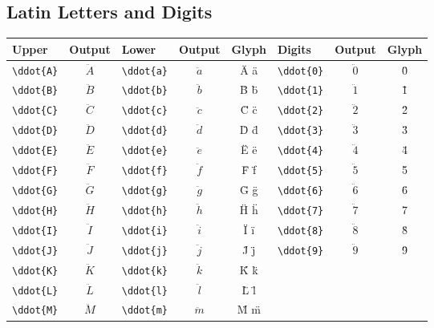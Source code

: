 \documentclass[12pt,a4paper]{article}
\begin{document}
\subsection*{Latin Letters and Digits}
\begin{longtable}{|l|c|l|c|c|l|c|c|}
\hline
\textbf{Upper}  & \textbf{Output} & \textbf{Lower}  & \textbf{Output} & \textbf{Glyph} & \textbf{Digits} & \textbf{Output} & \textbf{Glyph} \\
\hline
\verb|\ddot{A}| & $\ddot{A}$      & \verb|\ddot{a}| & $\ddot{a}$      & Ä ä            & \verb|\ddot{0}| & $\ddot{0}$      & 0̈ \\
\verb|\ddot{B}| & $\ddot{B}$      & \verb|\ddot{b}| & $\ddot{b}$      & B̈ b̈            & \verb|\ddot{1}| & $\ddot{1}$      & 1̈ \\
\verb|\ddot{C}| & $\ddot{C}$      & \verb|\ddot{c}| & $\ddot{c}$      & C̈ c̈            & \verb|\ddot{2}| & $\ddot{2}$      & 2̈ \\
\verb|\ddot{D}| & $\ddot{D}$      & \verb|\ddot{d}| & $\ddot{d}$      & D̈ d̈            & \verb|\ddot{3}| & $\ddot{3}$      & 3̈ \\
\verb|\ddot{E}| & $\ddot{E}$      & \verb|\ddot{e}| & $\ddot{e}$      & Ë ë            & \verb|\ddot{4}| & $\ddot{4}$      & 4̈ \\
\verb|\ddot{F}| & $\ddot{F}$      & \verb|\ddot{f}| & $\ddot{f}$      & F̈ f̈            & \verb|\ddot{5}| & $\ddot{5}$      & 5̈ \\
\verb|\ddot{G}| & $\ddot{G}$      & \verb|\ddot{g}| & $\ddot{g}$      & G̈ g̈            & \verb|\ddot{6}| & $\ddot{6}$      & 6̈ \\
\verb|\ddot{H}| & $\ddot{H}$      & \verb|\ddot{h}| & $\ddot{h}$      & Ḧ ḧ            & \verb|\ddot{7}| & $\ddot{7}$      & 7̈ \\
\verb|\ddot{I}| & $\ddot{I}$      & \verb|\ddot{i}| & $\ddot{i}$      & Ï ï            & \verb|\ddot{8}| & $\ddot{8}$      & 8̈ \\
\verb|\ddot{J}| & $\ddot{J}$      & \verb|\ddot{j}| & $\ddot{j}$      & J̈ j̈            & \verb|\ddot{9}| & $\ddot{9}$      & 9̈ \\
\verb|\ddot{K}| & $\ddot{K}$      & \verb|\ddot{k}| & $\ddot{k}$      & K̈ k̈            &                 &                 & \\
\verb|\ddot{L}| & $\ddot{L}$      & \verb|\ddot{l}| & $\ddot{l}$      & L̈ l̈            &                 &                 & \\
\verb|\ddot{M}| & $\ddot{M}$      & \verb|\ddot{m}| & $\ddot{m}$      & M̈ m̈            &                 &                 & \\

\end{longtable}
\end{document}
